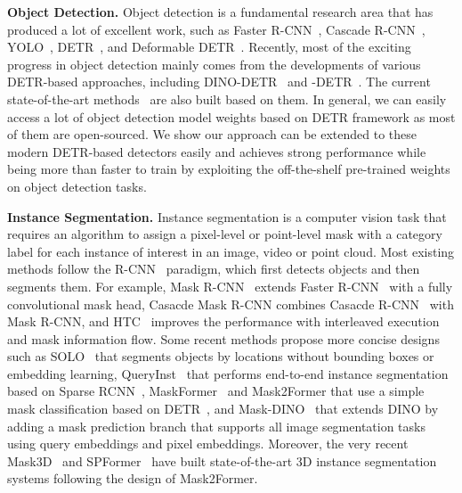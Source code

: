 \documentclass[10pt,twocolumn,letterpaper]{article}
\begin{document}
\vspace{1mm}
\noindent\textbf{Object Detection.}
Object detection is a fundamental research area that has produced a lot of excellent work, such as Faster R-CNN~\cite{ren2015faster}, Cascade R-CNN~\cite{cai2018cascade}, YOLO~\cite{redmon2016you}, DETR~\cite{carion2020end}, and Deformable DETR~\cite{zhu2020deformable}.
Recently, most of the exciting progress in object detection mainly comes from the developments of various DETR-based approaches, including DINO-DETR~\cite{zhang2022dino} and -DETR~\cite{jia2022detrs}.
The current state-of-the-art methods~\cite{wang2022internimage,lin2023detr,ma2023revisiting,liang2022expediting,he2022rankseg} are also built based on them.
In general, we can easily access a lot of object detection model weights based on DETR framework as most of them are open-sourced.
We show our approach can be extended to these modern DETR-based detectors easily and achieves strong performance while being more than  faster to train by exploiting the off-the-shelf pre-trained weights on object detection tasks.


\vspace{1mm}
\noindent\textbf{Instance Segmentation.}
Instance segmentation is a computer vision task that requires an algorithm to assign a pixel-level or point-level mask with a category label for each instance of interest in an image, video or point cloud. Most existing methods follow the R-CNN~\cite{girshick2014rich} paradigm, which first detects objects and then segments them. For example, Mask R-CNN~\cite{he2017mask} extends Faster R-CNN~\cite{ren2015faster} with a fully convolutional mask head, Casacde Mask R-CNN combines Casacde R-CNN~\cite{cai2018cascade} with Mask R-CNN, and HTC~\cite{chen2019hybrid} improves the performance with interleaved execution and mask information flow. Some recent methods propose more concise designs such as SOLO~\cite{xwang20} that segments objects by locations without bounding boxes or embedding learning, QueryInst~\cite{FangQueryInst} that performs end-to-end instance segmentation based on Sparse RCNN~\cite{sun2021sparse}, MaskFormer~\cite{cheng2021per} and Mask2Former\cite{cheng2022masked} that use a simple mask classification based on DETR~\cite{carion2020end}, and Mask-DINO~\cite{li2022mask} that extends DINO by adding a mask prediction branch that supports all image segmentation tasks using query embeddings and pixel embeddings.
Moreover, the very recent Mask3D~\cite{schult2022mask3d} and SPFormer~\cite{sun2022superpoint} have built state-of-the-art 3D instance segmentation systems following the design of Mask2Former.
\end{document}

